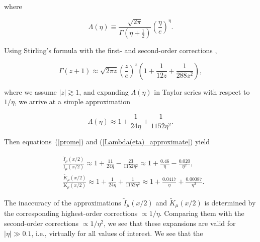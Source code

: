 \documentclass[draft]{agujournal2019}
\begin{document}
{\begin{linenomath*}
\end{linenomath*}
where
\begin{linenomath*}
\begin{equation}
\Lambda\left(  \eta\right)  \equiv\frac{\sqrt{2\pi}}{\Gamma\left(  \eta
+\frac{1}{2}\right)  }\left(  \frac{\eta}{e}\right)  ^{\eta}.
\label{Lambda(eta)}
\end{equation}
\end{linenomath*}
Using Stirling's formula with the first- and second-order corrections
\cite{Arfken:Mathematical},
\begin{linenomath*}
\begin{equation}
\Gamma(z+1)\approx\sqrt{2\pi z}\left(  \frac{z}{e}\right)  ^{z}\left(
1+\frac{1}{12z}+\frac{1}{288z^{2}}\right)  , 
\label{Stirling_accurate}
\end{equation}
\end{linenomath*}
where we assume $\left\vert z\right\vert \gtrsim1$, and expanding $\Lambda\left(
\eta\right)  $ in Taylor series with respect to $1/\eta$, we arrive at a
simple approximation
\begin{linenomath*}
\begin{equation}
\Lambda\left(  \eta\right)  \approx1+\frac{1}{24\eta}+\frac{1}{1152\eta^{2}}.
\label{Lambda(eta)_approximate}
\end{equation}
\end{linenomath*}
Then equations~(\ref{prome}) and (\ref{Lambda(eta)_approximate}) yield
\begin{linenomath*}
\begin{subequations}
\label{accuracy_I,K_x<<1}
\begin{align}
&  \frac{\tilde{I}_{\mu}(x/2)}{\mathrm{I}_{\mu}(x/2)}\approx1+\frac{11}{24\eta}-\frac{23}{1152\eta^{2}}%
\approx1+\frac{0.46}{\eta}-\frac{0.020}{\eta^{2}},\label{accuracy_I_x<<1}\\
&  \frac{\tilde{K}_{\mu}(x/2)  }{\mathrm{K}_{\mu}(x/2)}\approx1+\frac{1}{24\eta}+\frac{1}{1152\eta^{2}}%
\approx1+\frac{0.0417}{\eta}+\frac{0.00087}{\eta^{2}}. \label{accuracy_K_x<<1}%
\end{align}
\end{subequations}
\end{linenomath*}
The inaccuracy of the approximations $\tilde{I}_{\mu}(x/2)$ 
and $\tilde{K}_{\mu}(x/2)$ is determined
by the corresponding highest-order corrections $\propto1/\eta$. Comparing them
with the second-order corrections $\propto1/\eta^{2}$, we see that these
expansions are valid for $|\eta| \gg0.1$, i.e., virtually for all values of interest. We see that the
}
\end{document}
